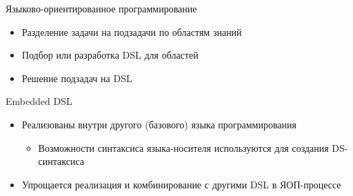 \documentclass[aspectratio=169,14pt]{beamer}
\begin{document}
    \begin{frame}[fragile]{\Large Языково-ориентированное программирование}
        \begin{itemize}
            \item Разделение задачи на подзадачи по областям знаний
            \item Подбор или разработка DSL для областей
            \item Решение подзадач на DSL
        \end{itemize}
    \end{frame}

    \begin{frame}[fragile]{Embedded DSL}
        \begin{itemize}
            \item Реализованы внутри другого (базового) языка программирования
            \begin{itemize}
                \item Возможности синтаксиса языка-носителя используются для создания DS-синтаксиса
            \end{itemize}
            \item Упрощается реализация и комбинирование с другими DSL в ЯОП-процессе
        \end{itemize}
    \end{frame}
\end{document}

